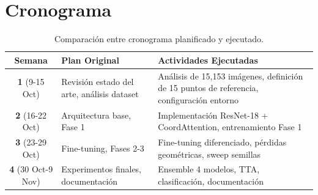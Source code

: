 \documentclass[12pt,a4paper]{article}
\begin{document}
\section{Cronograma}

\begin{table}[H]
\centering
\small
\begin{tabular}{cp{5cm}p{6cm}}
\toprule
\textbf{Semana} & \textbf{Plan Original} & \textbf{Actividades Ejecutadas} \\
\midrule
\textbf{1} (9-15 Oct) & Revisión estado del arte, análisis dataset & Análisis de 15,153 imágenes, definición de 15 puntos de referencia, configuración entorno \\
\textbf{2} (16-22 Oct) & Arquitectura base, Fase 1 & Implementación ResNet-18 + CoordAttention, entrenamiento Fase 1 \\
\textbf{3} (23-29 Oct) & Fine-tuning, Fases 2-3 & Fine-tuning diferenciado, pérdidas geométricas, sweep semillas \\
\textbf{4} (30 Oct-9 Nov) & Experimentos finales, documentación & Ensemble 4 modelos, TTA, clasificación, documentación \\
\bottomrule
\end{tabular}
\caption{Comparación entre cronograma planificado y ejecutado.}
\end{table}
\end{document}
